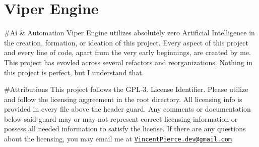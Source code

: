 \chapter{Viper Engine }
\hypertarget{index}{}\label{index}
\+\#\+Ai \& Automation Viper Engine utilizes absolutely zero Artificial Intelligence in the creation, formation, or ideation of this project. Every aspect of this project and every line of code, apart from the very early beginnings, are created by me. This project has evovled across several refactors and reorganizations. Nothing in this project is perfect, but I understand that.

\+\#\+Attributions This project follows the GPL-\/3. License Identifier. Please utilize and follow the licensing aggreement in the root directory. All licensing info is provided in every file above the header guard. Any comments or documentation below said guard may or may not represent correct licensing information or possess all needed information to satisfy the license. If there are any questions about the licensing, you may email me at \href{mailto:VincentPierce.dev@gmail.com}{\texttt{Vincent\+Pierce.\+dev@gmail.\+com}} 